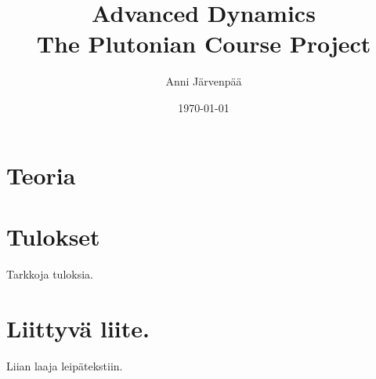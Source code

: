 \documentclass[12pt,a4paper,titlepage]{article}
\title{Advanced Dynamics \\ The Plutonian Course Project \vspace{0.5em}}
\author{Anni Järvenpää}
\date{\today}
\begin{document}
\maketitle



\section{Teoria}



\section{Tulokset}
Tarkkoja tuloksia.





\appendix
\newpage
\section{Liittyvä liite.} \label{koodi}
Liian laaja leipätekstiin.
\end{document}
